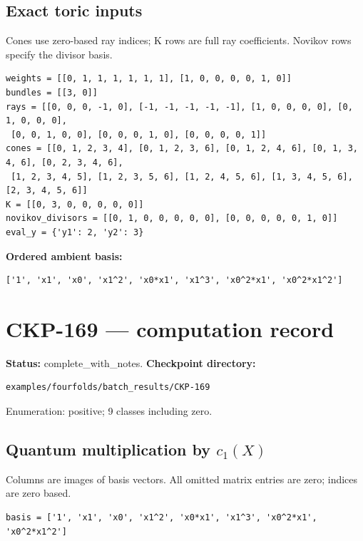 \documentclass[10pt,a4paper]{article}
\begin{document}
\subsection*{Exact toric inputs}
Cones use zero-based ray indices; K rows are full ray coefficients. Novikov rows specify the divisor basis.

\begin{lstlisting}
weights = [[0, 1, 1, 1, 1, 1, 1], [1, 0, 0, 0, 0, 1, 0]]
bundles = [[3, 0]]
rays = [[0, 0, 0, -1, 0], [-1, -1, -1, -1, -1], [1, 0, 0, 0, 0], [0, 1, 0, 0, 0],
 [0, 0, 1, 0, 0], [0, 0, 0, 1, 0], [0, 0, 0, 0, 1]]
cones = [[0, 1, 2, 3, 4], [0, 1, 2, 3, 6], [0, 1, 2, 4, 6], [0, 1, 3, 4, 6], [0, 2, 3, 4, 6],
 [1, 2, 3, 4, 5], [1, 2, 3, 5, 6], [1, 2, 4, 5, 6], [1, 3, 4, 5, 6], [2, 3, 4, 5, 6]]
K = [[0, 3, 0, 0, 0, 0, 0]]
novikov_divisors = [[0, 1, 0, 0, 0, 0, 0], [0, 0, 0, 0, 0, 1, 0]]
eval_y = {'y1': 2, 'y2': 3}
\end{lstlisting}

\textbf{Ordered ambient basis:}
\begin{lstlisting}
['1', 'x1', 'x0', 'x1^2', 'x0*x1', 'x1^3', 'x0^2*x1', 'x0^2*x1^2']
\end{lstlisting}

\clearpage\section*{CKP-169 --- computation record}
\textbf{Status:} complete\_with\_notes.
\textbf{Checkpoint directory:}
\begin{lstlisting}
examples/fourfolds/batch_results/CKP-169
\end{lstlisting}

Enumeration: positive; 9 classes including zero.
\subsection*{Quantum multiplication by $c_1(X)$}
Columns are images of basis vectors. All omitted matrix entries are zero; indices are zero based.

\begin{lstlisting}
basis = ['1', 'x1', 'x0', 'x1^2', 'x0*x1', 'x1^3', 'x0^2*x1', 'x0^2*x1^2']
\end{lstlisting}
\end{document}
